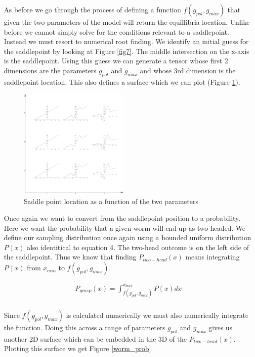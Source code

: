 \documentclass[letterpaper]{article}
\begin{document}
As before we go through the process of defining a function $f(g_{pol},g_{max})$ that
given the two parameters of the model will return the equillibria location. Unlike 
before we cannot simply solve for the conditions relevant to a saddlepoint. Instead
we must resort to numerical root finding. We identify an initial guess for the saddlepoint 
by looking at Figure \ref{fig7}. The middle intersection on the x-axis is the saddlepoint.
Using this guess we can generate a tensor whose first 2 dimensions are the parameters 
$g_{pol}$ and $g_{max}$ and whose 3rd dimension is the saddlepoint location. This also
defines a surface which we can plot (Figure \ref{worm_sp}).

\begin{figure}[t]
\begin{center}
\includegraphics[width=2.1in,angle=0]{./worm_params.png}
\caption{Saddle point location as a function of the two parameters}
\label{worm_sp}
\end{center}
\end{figure}

Once again we want to convert from the saddlepoint position to a probability. Here we 
want the probability that a given worm will end up as two-headed. We define our sampling
distribution once again using a bounded uniform distribution $P(x)$ also identitical 
to equation 4. The two-head outcome is on the left side of the saddlepoint. Thus 
we know that finding $P_{two-head}(x)$ means integrating $P(x)$ from $x_{min}$ to
$f(g_{pol},g_{max})$.

\begin{eqnarray}
    P_{grasp}(x) = \int_{f(g_{pol},g_{max})}^{x_{max}}P(x)dx\\
\end{eqnarray}

Since $f(g_{pol},g_{max})$ is calculated numerically we must also numerically integrate the
function. Doing this across a range of parameters $g_{pol}$ and $g_{max}$ gives us another
2D surface which can be embedded in the 3D of the $P_{two-head}(x)$. Plotting this surface
we get Figure \ref{worm_prob}.
\end{document}
